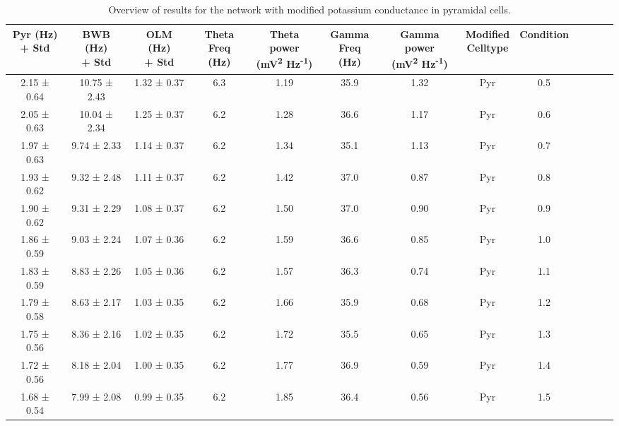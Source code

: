 \begin{table}[htbp]
    \caption[Potassium variant: Pyramidal cell]{Overview of results for the network with modified potassium conductance in pyramidal cells.}\label{table:K_variant_pyr}
    \begin{adjustbox}{width=\textwidth}
        \begin{tabular}{ccccccccccccc}
            \hline
            \CellWithForcedBreak{Pyr (Hz)                                                   \\ + Std} & \CellWithForcedBreak{BWB (Hz) \\ + Std} & \CellWithForcedBreak{OLM (Hz) \\ + Std} & \CellWithForcedBreak{Theta \\ Freq (Hz)} & \CellWithForcedBreak{Theta power \\ (mV\textsuperscript{2} Hz\textsuperscript{-1})} & \CellWithForcedBreak{Gamma \\ Freq (Hz)} & \CellWithForcedBreak{Gamma power \\ (mV\textsuperscript{2} Hz\textsuperscript{-1})} & \CellWithForcedBreak{Modified \\ Celltype} & Condition \\
            \hline
            2.15 ± 0.64 & 10.75 ± 2.43 & 1.32 ± 0.37 & 6.3 & 1.19 & 35.9 & 1.32 & Pyr & 0.5 \\
            2.05 ± 0.63 & 10.04 ± 2.34 & 1.25 ± 0.37 & 6.2 & 1.28 & 36.6 & 1.17 & Pyr & 0.6 \\
            1.97 ± 0.63 & 9.74 ± 2.33  & 1.14 ± 0.37 & 6.2 & 1.34 & 35.1 & 1.13 & Pyr & 0.7 \\
            1.93 ± 0.62 & 9.32 ± 2.48  & 1.11 ± 0.37 & 6.2 & 1.42 & 37.0 & 0.87 & Pyr & 0.8 \\
            1.90 ± 0.62 & 9.31 ± 2.29  & 1.08 ± 0.37 & 6.2 & 1.50 & 37.0 & 0.90 & Pyr & 0.9 \\
            1.86 ± 0.59 & 9.03 ± 2.24  & 1.07 ± 0.36 & 6.2 & 1.59 & 36.6 & 0.85 & Pyr & 1.0 \\
            1.83 ± 0.59 & 8.83 ± 2.26  & 1.05 ± 0.36 & 6.2 & 1.57 & 36.3 & 0.74 & Pyr & 1.1 \\
            1.79 ± 0.58 & 8.63 ± 2.17  & 1.03 ± 0.35 & 6.2 & 1.66 & 35.9 & 0.68 & Pyr & 1.2 \\
            1.75 ± 0.56 & 8.36 ± 2.16  & 1.02 ± 0.35 & 6.2 & 1.72 & 35.5 & 0.65 & Pyr & 1.3 \\
            1.72 ± 0.56 & 8.18 ± 2.04  & 1.00 ± 0.35 & 6.2 & 1.77 & 36.9 & 0.59 & Pyr & 1.4 \\
            1.68 ± 0.54 & 7.99 ± 2.08  & 0.99 ± 0.35 & 6.2 & 1.85 & 36.4 & 0.56 & Pyr & 1.5 \\
            \hline
        \end{tabular}
    \end{adjustbox}
\end{table}
